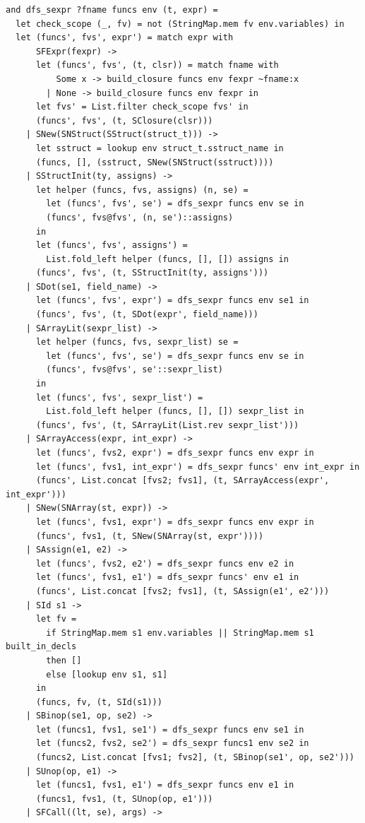 \documentclass[12pt]{article}
\begin{document}
\begin{mdframed}[hidealllines=true,backgroundcolor=blue!20]
\begin{lstlisting}
and dfs_sexpr ?fname funcs env (t, expr) =
  let check_scope (_, fv) = not (StringMap.mem fv env.variables) in
  let (funcs', fvs', expr') = match expr with
      SFExpr(fexpr) ->
      let (funcs', fvs', (t, clsr)) = match fname with
          Some x -> build_closure funcs env fexpr ~fname:x
        | None -> build_closure funcs env fexpr in
      let fvs' = List.filter check_scope fvs' in
      (funcs', fvs', (t, SClosure(clsr)))
    | SNew(SNStruct(SStruct(struct_t))) ->
      let sstruct = lookup env struct_t.sstruct_name in
      (funcs, [], (sstruct, SNew(SNStruct(sstruct))))
    | SStructInit(ty, assigns) ->
      let helper (funcs, fvs, assigns) (n, se) =
        let (funcs', fvs', se') = dfs_sexpr funcs env se in
        (funcs', fvs@fvs', (n, se')::assigns)
      in
      let (funcs', fvs', assigns') = 
        List.fold_left helper (funcs, [], []) assigns in
      (funcs', fvs', (t, SStructInit(ty, assigns')))
    | SDot(se1, field_name) ->
      let (funcs', fvs', expr') = dfs_sexpr funcs env se1 in
      (funcs', fvs', (t, SDot(expr', field_name))) 
    | SArrayLit(sexpr_list) ->
      let helper (funcs, fvs, sexpr_list) se =
        let (funcs', fvs', se') = dfs_sexpr funcs env se in
        (funcs', fvs@fvs', se'::sexpr_list)
      in
      let (funcs', fvs', sexpr_list') = 
        List.fold_left helper (funcs, [], []) sexpr_list in
      (funcs', fvs', (t, SArrayLit(List.rev sexpr_list')))
    | SArrayAccess(expr, int_expr) ->
      let (funcs', fvs2, expr') = dfs_sexpr funcs env expr in
      let (funcs', fvs1, int_expr') = dfs_sexpr funcs' env int_expr in
      (funcs', List.concat [fvs2; fvs1], (t, SArrayAccess(expr', int_expr')))
    | SNew(SNArray(st, expr)) ->
      let (funcs', fvs1, expr') = dfs_sexpr funcs env expr in
      (funcs', fvs1, (t, SNew(SNArray(st, expr'))))
    | SAssign(e1, e2) ->
      let (funcs', fvs2, e2') = dfs_sexpr funcs env e2 in
      let (funcs', fvs1, e1') = dfs_sexpr funcs' env e1 in
      (funcs', List.concat [fvs2; fvs1], (t, SAssign(e1', e2')))
    | SId s1 ->
      let fv =
        if StringMap.mem s1 env.variables || StringMap.mem s1 built_in_decls
        then []
        else [lookup env s1, s1]
      in
      (funcs, fv, (t, SId(s1)))
    | SBinop(se1, op, se2) ->
      let (funcs1, fvs1, se1') = dfs_sexpr funcs env se1 in
      let (funcs2, fvs2, se2') = dfs_sexpr funcs1 env se2 in
      (funcs2, List.concat [fvs1; fvs2], (t, SBinop(se1', op, se2')))
    | SUnop(op, e1) ->
      let (funcs1, fvs1, e1') = dfs_sexpr funcs env e1 in
      (funcs1, fvs1, (t, SUnop(op, e1')))
    | SFCall((lt, se), args) ->

\end{lstlisting}
\end{mdframed}
\end{document}
